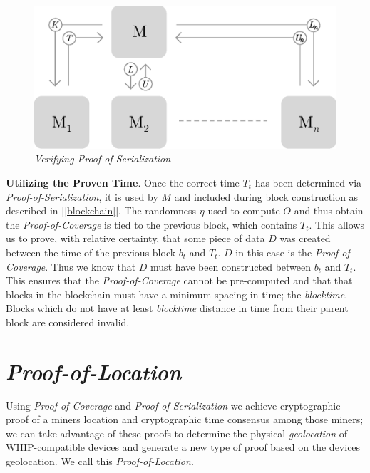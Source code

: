 \documentclass[10pt, nonatbib, nocopyrightspace, reprint]{sigplanconf}
\newcommand{\secref}[1]{[\autoref{#1}]}
\begin{document}
\begin{figure}[ht]
    \begin{center}
          \includegraphics[width=\columnwidth]{verify_serialization.eps}
          \caption{\emph{Verifying Proof-of-Serialization}}
          \label{fig:verify-serialization}
     \end{center}
\end{figure}

\textbf{Utilizing the Proven Time}. Once the correct time $T_t$ has been determined via \emph{Proof-of-Serialization}, it is used by $M$ and included during block construction as described in \secref{blockchain}. The randomness $\eta$ used to compute $O$ and thus obtain the \emph{Proof-of-Coverage} is tied to the previous block, which contains $T_t$. This allows us to prove, with relative certainty, that some piece of data $D$ was created between the time of the previous block $b_t$ and $T_t$. $D$ in this case is the \emph{Proof-of-Coverage}. Thus we know that $D$ must have been constructed between $b_t$ and $T_t$. This ensures that the \emph{Proof-of-Coverage} cannot be pre-computed and that that blocks in the blockchain must have a minimum spacing in time; the \emph{blocktime}. Blocks which do not have at least \emph{blocktime} distance in time from their parent block are considered invalid.

\section{\emph{Proof-of-Location}} \label{geolocation}

Using \emph{Proof-of-Coverage} and \emph{Proof-of-Serialization} we achieve cryptographic proof of a miners location and cryptographic time consensus among those miners; we can take advantage of these proofs to determine the physical \emph{geolocation} of WHIP-compatible devices and generate a new type of proof based on the devices geolocation. We call this \emph{Proof-of-Location}.
\end{document}
